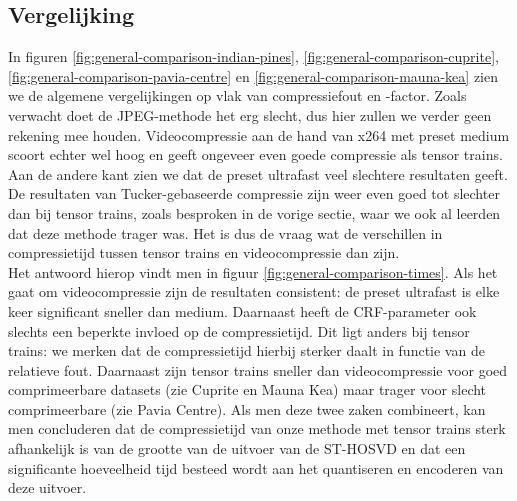 \subsection{Vergelijking}

In figuren \ref{fig:general-comparison-indian-pines}, \ref{fig:general-comparison-cuprite}, \ref{fig:general-comparison-pavia-centre} en \ref{fig:general-comparison-mauna-kea} zien we de algemene vergelijkingen op vlak van compressiefout en -factor. Zoals verwacht doet de JPEG-methode het erg slecht, dus hier zullen we verder geen rekening mee houden. Videocompressie aan de hand van x264 met preset medium scoort echter wel hoog en geeft ongeveer even goede compressie als tensor trains. Aan de andere kant zien we dat de preset ultrafast veel slechtere resultaten geeft. De resultaten van Tucker-gebaseerde compressie zijn weer even goed tot slechter dan bij tensor trains, zoals besproken in de vorige sectie, waar we ook al leerden dat deze methode trager was. Het is dus de vraag wat de verschillen in compressietijd tussen tensor trains en videocompressie dan zijn.\\

Het antwoord hierop vindt men in figuur \ref{fig:general-comparison-times}. Als het gaat om videocompressie zijn de resultaten consistent: de preset ultrafast is elke keer significant sneller dan medium. Daarnaast heeft de CRF-parameter ook slechts een beperkte invloed op de compressietijd. Dit ligt anders bij tensor trains: we merken dat de compressietijd hierbij sterker daalt in functie van de relatieve fout. Daarnaast zijn tensor trains sneller dan videocompressie voor goed comprimeerbare datasets (zie Cuprite en Mauna Kea) maar trager voor slecht comprimeerbare (zie Pavia Centre). Als men deze twee zaken combineert, kan men concluderen dat de compressietijd van onze methode met tensor trains sterk afhankelijk is van de grootte van de uitvoer van de ST-HOSVD en dat een significante hoeveelheid tijd besteed wordt aan het quantiseren en encoderen van deze uitvoer.

